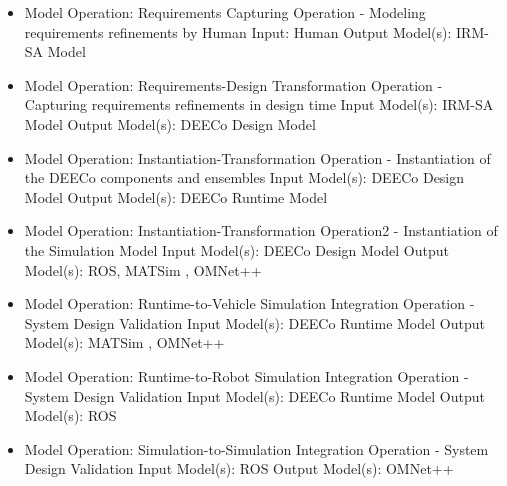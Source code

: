 \begin{itemize}
    \item Model Operation: Requirements Capturing Operation - Modeling requirements refinements by Human
        \subitem Input: Human 
        \subitem Output Model(s): IRM-SA Model
        
    \item Model Operation: Requirements-Design Transformation Operation - Capturing requirements refinements in design time
        \subitem Input Model(s): IRM-SA Model
        \subitem Output Model(s): DEECo Design Model 
        
   \item  Model Operation: Instantiation-Transformation Operation - Instantiation of the DEECo components and ensembles 
        \subitem Input Model(s): DEECo Design Model
        \subitem Output Model(s): DEECo Runtime Model
        
   \item  Model Operation: Instantiation-Transformation Operation2 - Instantiation of the Simulation Model 
        \subitem Input Model(s): DEECo Design Model
        \subitem Output Model(s): ROS, MATSim , OMNet++ 

    \item Model Operation: Runtime-to-Vehicle Simulation Integration Operation - System Design Validation
        \subitem Input Model(s): DEECo Runtime Model
        \subitem Output Model(s): MATSim , OMNet++ 
        
    \item Model Operation: Runtime-to-Robot Simulation Integration Operation - System Design Validation
        \subitem Input Model(s): DEECo Runtime Model
        \subitem Output Model(s): ROS 
        
    \item Model Operation: Simulation-to-Simulation Integration Operation - System Design Validation
        \subitem Input Model(s): ROS
        \subitem Output Model(s): OMNet++ %
    
\end{itemize}

